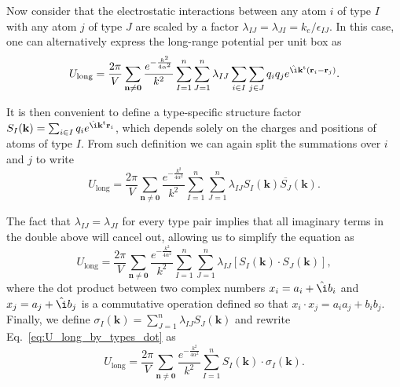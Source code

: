 \documentclass[11pt]{article}
\newcommand{\vt}[1]{\boldsymbol{\mathbf{#1}}}           %
\newcommand{\tr}[1]{#1^\text{t}}                        %
\newcommand{\im}{\hat{\i}}                              %
\begin{document}
Now consider that the electrostatic interactions between any atom $i$ of type $I$ with any atom $j$ of type $J$ are scaled by a factor $\lambda_{IJ} = \lambda_{JI} = k_e/\epsilon_{IJ}$. In this case, one can alternatively express the long-range potential per unit box as
\begin{equation*}
U_\text{long} = \frac{2\pi}{V}\sum_{\vt n \neq \vt 0} \frac{e^{-\frac{k^2}{4\alpha^2}}}{k^2} \sum_{I=1}^n \sum_{J=1}^n \lambda_{IJ} \sum_{i \in I} \sum_{j \in J} q_i q_j e^{\im \tr{\vt k}({\vt r}_i - {\vt r}_j)}.
\end{equation*}

It is then convenient to define a type-specific structure factor $S_I(\vt k) = \sum_{i \in I} q_i e^{\im \tr{\vt k}{\vt r}_i}$, which depends solely on the charges and positions of atoms of type $I$. From such definition we can again split the summations over $i$ and $j$ to write
\begin{equation}
\label{eq:U_long_by_types_1}
U_\text{long} = \frac{2\pi}{V}\sum_{\vt n \neq \vt 0} \frac{e^{-\frac{k^2}{4\alpha^2}}}{k^2} \sum_{I=1}^n \sum_{J=1}^n \lambda_{IJ} S_I(\vt k) \overline{S_J}(\vt k).
\end{equation}

The fact that $\lambda_{IJ} = \lambda_{JI}$ for every type pair implies that all imaginary terms in the double above will cancel out, allowing us to simplify the equation as
\begin{equation}
\label{eq:U_long_by_types_dot}
U_\text{long} = \frac{2\pi}{V}\sum_{\vt n \neq \vt 0} \frac{e^{-\frac{k^2}{4\alpha^2}}}{k^2} \sum_{I=1}^n \sum_{J=1}^n \lambda_{IJ} [S_I(\vt k) \cdot S_J(\vt k)],
\end{equation}
where the dot product between two complex numbers $x_i = a_i + \im b_i$ and $x_j = a_j + \im b_j$ is a commutative operation defined so that $x_i \cdot x_j = a_i a_j + b_i b_j$. Finally, we define $\sigma_I(\vt k) = \sum_{J=1}^n \lambda_{IJ} S_J(\vt k)$ and rewrite Eq.~\ref{eq:U_long_by_types_dot} as
\begin{equation*}
U_\text{long} = \frac{2\pi}{V}\sum_{\vt n \neq \vt 0} \frac{e^{-\frac{k^2}{4\alpha^2}}}{k^2} \sum_{I=1}^n S_I(\vt k) \cdot \sigma_I(\vt k).
\end{equation*}
\end{document}

